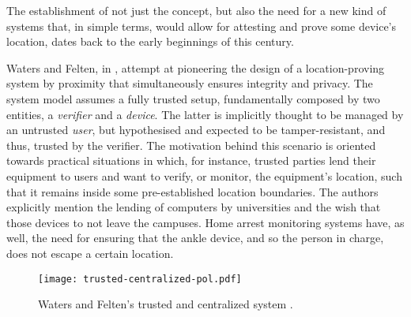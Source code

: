 The establishment of not just the concept, but also the need for a new kind of systems that, in simple terms, would allow for attesting and prove some device's location, dates back to the early beginnings of this century. 

Waters and Felten, in \cite{waters2003secure}, attempt at pioneering the design of a location-proving system by proximity that simultaneously ensures integrity and privacy. The system model assumes a fully trusted setup, fundamentally composed by two entities, a \emph{verifier} and a \emph{device}. The latter is implicitly thought to be managed by an untrusted \emph{user}, but hypothesised and expected to be tamper-resistant, and thus, trusted by the verifier. The motivation behind this scenario is oriented towards practical situations in which, for instance, trusted parties lend their equipment to users and want to verify, or monitor, the equipment's location, such that it remains inside some pre-established location boundaries. The authors explicitly mention the lending of computers by universities and the wish that those devices to not leave the campuses. Home arrest monitoring systems have, as well, the need for ensuring that the ankle device, and so the person in charge, does not escape a certain location. 

\begin{figure}[ht]
    \begin{center}
    \texttt{[image: trusted-centralized-pol.pdf]}
    \caption{Waters and Felten's trusted and centralized \pol{} system \cite{waters2003secure}.}
    \label{fig:trusted-centralized-pol}
    \end{center}
\end{figure}

